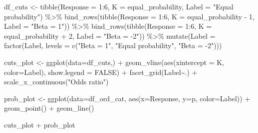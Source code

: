 \documentclass[
]{book}
\newenvironment{Shaded}{\begin{snugshade}}{\end{snugshade}}
\newcommand{\AttributeTok}[1]{\textcolor[rgb]{0.77,0.63,0.00}{#1}}
\newcommand{\ConstantTok}[1]{\textcolor[rgb]{0.00,0.00,0.00}{#1}}
\newcommand{\DecValTok}[1]{\textcolor[rgb]{0.00,0.00,0.81}{#1}}
\newcommand{\FunctionTok}[1]{\textcolor[rgb]{0.00,0.00,0.00}{#1}}
\newcommand{\NormalTok}[1]{#1}
\newcommand{\OtherTok}[1]{\textcolor[rgb]{0.56,0.35,0.01}{#1}}
\newcommand{\SpecialCharTok}[1]{\textcolor[rgb]{0.00,0.00,0.00}{#1}}
\newcommand{\StringTok}[1]{\textcolor[rgb]{0.31,0.60,0.02}{#1}}
\begin{document}
\begin{Shaded}
\begin{Highlighting}[]
\NormalTok{df\_cuts }\OtherTok{\textless{}{-}}
  \FunctionTok{tibble}\NormalTok{(}\AttributeTok{Response =} \DecValTok{1}\SpecialCharTok{:}\DecValTok{6}\NormalTok{, }
         \AttributeTok{K =}\NormalTok{ equal\_probability,}
         \AttributeTok{Label =} \StringTok{"Equal probability"}\NormalTok{) }\SpecialCharTok{\%\textgreater{}\%}
  \FunctionTok{bind\_rows}\NormalTok{(}\FunctionTok{tibble}\NormalTok{(}\AttributeTok{Response =} \DecValTok{1}\SpecialCharTok{:}\DecValTok{6}\NormalTok{, }
         \AttributeTok{K =}\NormalTok{ equal\_probability }\SpecialCharTok{{-}} \DecValTok{1}\NormalTok{,}
         \AttributeTok{Label =} \StringTok{"Beta = 1"}\NormalTok{)) }\SpecialCharTok{\%\textgreater{}\%}
  \FunctionTok{bind\_rows}\NormalTok{(}\FunctionTok{tibble}\NormalTok{(}\AttributeTok{Response =} \DecValTok{1}\SpecialCharTok{:}\DecValTok{6}\NormalTok{, }
         \AttributeTok{K =}\NormalTok{ equal\_probability }\SpecialCharTok{+} \DecValTok{2}\NormalTok{,}
         \AttributeTok{Label =} \StringTok{"Beta = {-}2"}\NormalTok{)) }\SpecialCharTok{\%\textgreater{}\%}
  \FunctionTok{mutate}\NormalTok{(}\AttributeTok{Label =} \FunctionTok{factor}\NormalTok{(Label, }\AttributeTok{levels =} \FunctionTok{c}\NormalTok{(}\StringTok{"Beta = 1"}\NormalTok{, }\StringTok{"Equal probability"}\NormalTok{, }\StringTok{"Beta = {-}2"}\NormalTok{)))}
  

\NormalTok{cuts\_plot }\OtherTok{\textless{}{-}}
  \FunctionTok{ggplot}\NormalTok{(}\AttributeTok{data=}\NormalTok{df\_cuts,) }\SpecialCharTok{+} 
  \FunctionTok{geom\_vline}\NormalTok{(}\FunctionTok{aes}\NormalTok{(}\AttributeTok{xintercept =}\NormalTok{ K, }\AttributeTok{color=}\NormalTok{Label), }\AttributeTok{show.legend =} \ConstantTok{FALSE}\NormalTok{) }\SpecialCharTok{+}
  \FunctionTok{facet\_grid}\NormalTok{(Label}\SpecialCharTok{\textasciitilde{}}\NormalTok{.) }\SpecialCharTok{+}
  \FunctionTok{scale\_x\_continuous}\NormalTok{(}\StringTok{"Odds ratio"}\NormalTok{)}

\NormalTok{prob\_plot }\OtherTok{\textless{}{-}} 
  \FunctionTok{ggplot}\NormalTok{(}\AttributeTok{data=}\NormalTok{df\_ord\_cat, }\FunctionTok{aes}\NormalTok{(}\AttributeTok{x=}\NormalTok{Response, }\AttributeTok{y=}\NormalTok{p, }\AttributeTok{color=}\NormalTok{Label)) }\SpecialCharTok{+} 
  \FunctionTok{geom\_point}\NormalTok{() }\SpecialCharTok{+} 
  \FunctionTok{geom\_line}\NormalTok{()}

\NormalTok{cuts\_plot }\SpecialCharTok{+}\NormalTok{ prob\_plot}
\end{Highlighting}
\end{Shaded}
\end{document}
